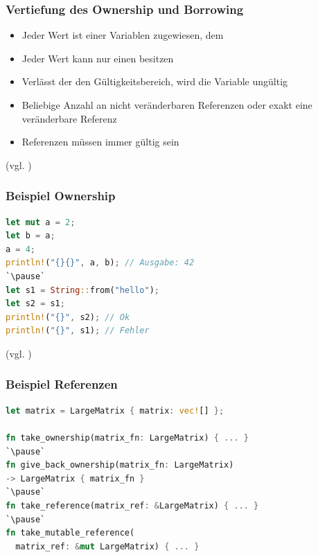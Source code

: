 \documentclass{beamer}
\begin{document}
\begin{frame}[fragile]
  \frametitle{Vertiefung des Ownership und Borrowing}
  \begin{itemize}
    \item Jeder Wert ist einer Variablen zugewiesen, dem  
    \pause
    \item Jeder Wert kann nur einen  besitzen
    \pause
    \item Verlässt der  den Gültigkeitsbereich, wird die Variable ungültig
    \pause
    \item Beliebige Anzahl an nicht veränderbaren Referenzen oder exakt eine veränderbare Referenz
    \pause
    \item Referenzen müssen immer gültig sein
  \end{itemize}
  {\small (vgl. \cite{Rules1} \cite{Rules2})}
\end{frame}

\begin{frame}[fragile]
  \frametitle{Beispiel Ownership}
  \begin{lstlisting}[language=rust]
let mut a = 2;
let b = a;
a = 4;
println!("{}{}", a, b); // Ausgabe: 42
`\pause`
let s1 = String::from("hello");
let s2 = s1;
println!("{}", s2); // Ok
println!("{}", s1); // Fehler\end{lstlisting}
  {\small (vgl. \cite{Rules1} \cite{Rules2})}
\end{frame}

\begin{frame}[fragile]
  \frametitle{Beispiel Referenzen}
  \begin{lstlisting}[language=rust]
let matrix = LargeMatrix { matrix: vec![] };

fn take_ownership(matrix_fn: LargeMatrix) { ... }
`\pause`
fn give_back_ownership(matrix_fn: LargeMatrix) 
-> LargeMatrix { matrix_fn }
`\pause`
fn take_reference(matrix_ref: &LargeMatrix) { ... }
`\pause`
fn take_mutable_reference(
  matrix_ref: &mut LargeMatrix) { ... }\end{lstlisting}
\end{frame}

\end{document}
